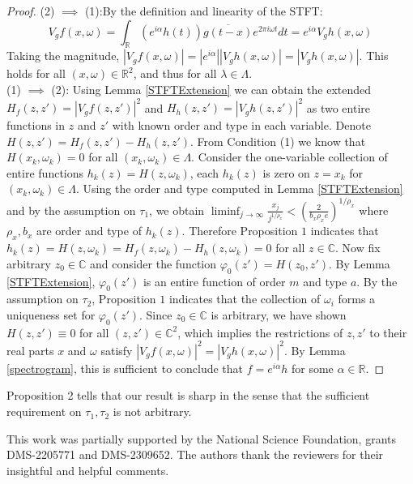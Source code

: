 \documentclass[graybox]{svmult}
\newcommand{\R}{\mathbb{R}}
\newcommand{\C}{\mathbb{C}}
\begin{document}
\begin{proof}
(2) $\implies$ (1):By the definition and linearity of the STFT:
\begin{equation*}
    V_g f(x, \omega) = \int_{\R} (e^{i\alpha} h(t)) \overline{g(t-x)} e^{2\pi i \omega t} dt = e^{i\alpha} V_g h(x, \omega) 
\end{equation*}
Taking the magnitude, $|V_g f(x, \omega)| = |e^{i\alpha}| |V_g h(x, \omega)| = |V_g h(x, \omega)|$. This holds for all $(x, \omega) \in \R^2$, and thus for all $\lambda \in \Lambda$.
\\
(1) $\implies$ (2): Using Lemma \ref{STFTExtension} we can obtain the extended $H_f(z,z') = |V_gf(z,z')|^2$ and $H_h(z,z') = |V_gh(z,z')|^2$ as two entire functions in $z$ and $z'$ with known order and type in each variable. Denote $H(z,z') = H_f(z,z') -H_h(z,z')$. From Condition (1) we know that $H(x_k, \omega_k) =0$ for all $(x_k, \omega_k) \in \Lambda$. Consider the one-variable collection of entire functions $h_k(z) = H(z, \omega_k)$, each $h_k(z)$ is zero on $z = x_k$ for $(x_k,\omega_k)\in\Lambda $. Using the order and type computed in Lemma \ref{STFTExtension} and by the assumption on $\tau_1$, we obtain $\liminf_{j \to \infty}\frac{x_j}{j^{1/\rho_x}}<(\frac{2}{b_x\rho_x e})^{1/\rho_x}$ where $\rho_x,b_x$ are order and type of $h_k(z)$. Therefore Proposition $1$ indicates that $h_k(z)= H(z,\omega_k) = H_f(z,\omega_k)-H_h(z,\omega_k)=0$ for all $z \in \C$. Now fix arbitrary $z_0 \in \C$ and consider the function $\varphi_0(z') = H(z_0,z')$. By Lemma \ref{STFTExtension}, $\varphi_0(z')$ is an entire function of order $m$ and type $a$. By the assumption on $\tau_2$, Proposition $1$ indicates that the collection of $\omega_i$ forms a uniqueness set for $\varphi_0(z')$. Since $z_0\in \C$ is arbitrary, we have shown $H(z,z')\equiv 0$ for all $(z,z') \in \C^2$, which implies the restrictions of $z, z'$ to their real parts $x$ and $\omega$ satisfy $|V_g f(x, \omega)|^2 = |V_g h(x, \omega)|^2$. By Lemma \ref{spectrogram}, this is sufficient to conclude that $f = e^{i \alpha}h$ for some $\alpha \in \R$.
\end{proof}
\begin{remark}
    Proposition 2 tells that our result is sharp in the sense that the sufficient requirement on $\tau_1,\tau_2$ is not arbitrary.
\end{remark}
\begin{acknowledgement}
This work was partially supported by the National Science Foundation, grants DMS-2205771 and DMS-2309652. The authors thank the reviewers for their insightful and helpful comments.
\end{acknowledgement}
\end{document}
